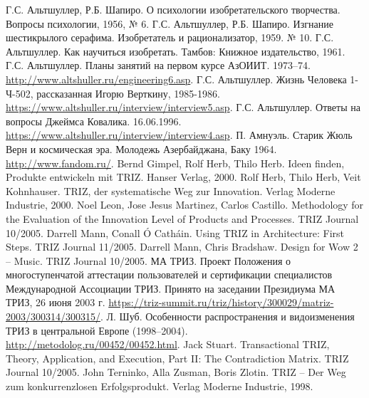 \begin{thebibliography}{xxx}
 Г.С. Альтшуллер, Р.Б. Шапиро. О психологии
  изобретательского творчества.  Вопросы психологии, 1956, № 6.
 Г.С. Альтшуллер, Р.Б. Шапиро. Изгнание шестикрылого
  серафима. Изобретатель и рационализатор, 1959. № 10.
 Г.С. Альтшуллер. Как научиться изобретать. Тамбов:
  Книжное издательство, 1961.
 Г.С. Альтшуллер. Планы занятий на первом курсе
  АзОИИТ.  1973--74. \url{http://www.altshuller.ru/engineering6.asp}.
 Г.С. Альтшуллер. Жизнь Человека 1-Ч-502, рассказанная
  Игорю Верткину, 1985-1986.
  \url{https://www.altshuller.ru/interview/interview5.asp}.
 Г.С. Альтшуллер. Ответы на вопросы Джеймса Ковалика.
  16.06.1996.  \url{https://www.altshuller.ru/interview/interview4.asp}.
 П. Амнуэль. Старик Жюль Верн и космическая эра. Молодежь
    Азербайджана, Баку 1964.  \url{http://www.fandom.ru/}.
 Bernd Gimpel, Rolf Herb, Thilo Herb. Ideen finden,
  Produkte entwickeln mit TRIZ. Hanser Verlag, 2000.
 Rolf Herb, Thilo Herb, Veit Kohnhauser. TRIZ, der
  systematische Weg zur Innovation. Verlag Moderne Industrie, 2000.
Noel Leon, Jose Jesus Martinez, Carlos Castillo.
  Methodology for the Evaluation of the Innovation Level of Products and
  Processes. TRIZ Journal 10/2005.
 Darrell Mann, Conall Ó Catháin.  Using TRIZ in
  Architecture: First Steps. TRIZ Journal 11/2005.
 Darrell Mann, Chris Bradshaw. Design for Wow 2 – Music.
  TRIZ Journal 10/2005.
 МА ТРИЗ. Проект Положения о многоступенчатой аттестации
  пользователей и сертификации специалистов Международной Ассоциации ТРИЗ.
  Принято на заседании Президиума МА ТРИЗ, 26 июня 2003 г.
  \url{https://triz-summit.ru/triz/history/300029/matriz-2003/300314/300315/}.
 Л. Шуб. Особенности распространения и видоизменения ТРИЗ в
  центральной Европе (1998--2004).
  \url{http://metodolog.ru/00452/00452.html}.
 Jack Stuart. Transactional TRIZ, Theory, Application, and
  Execution, Part II: The Contradiction Matrix. TRIZ Journal 10/2005.
 John Terninko, Alla Zusman, Boris Zlotin. TRIZ -- Der
  Weg zum konkurrenzlosen Erfolgsprodukt. Verlag Moderne Industrie, 1998.
\end{thebibliography}

